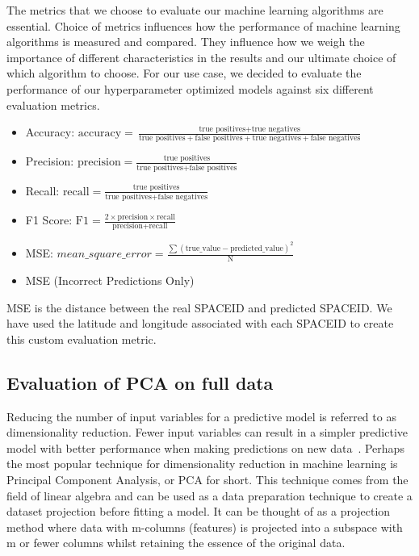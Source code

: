 \documentclass[a4paper,singleside,12pt]{report} %
\begin{document}
				The metrics that we choose to evaluate our machine learning algorithms are essential. 
				Choice of metrics influences how the performance of machine learning algorithms is measured and compared. 
				They influence how we weigh the importance of different characteristics in the results and our ultimate choice of which algorithm to choose. 
				For our use case, we decided to evaluate the performance of our hyperparameter optimized models against six different evaluation metrics. 

				\begin{itemize}
				\item Accuracy: $ \text{accuracy} = \frac{\text{true positives} + \text{true negatives}}{\text{true positives} + \text{false positives} + \text{true negatives} + \text{false negatives}}$
				\item Precision: $ \text{precision} = \frac{\text{true positives}}{\text{true positives} + \text{false positives}}$
				\item Recall: $ \text{recall} = \frac{\text{true positives}}{\text{true positives} + \text{false negatives}}$
				\item F1 Score: $ \text{F1} = \frac{2 \times \text{precision} \times \text{recall}}{\text{precision} + \text{recall}}$
				\item MSE: $mean\_square\_error = \frac{\sum (\text{true\_value} - \text{predicted\_value})^2}{\text{N}}$
				\item MSE (Incorrect Predictions Only)
				\end{itemize}
				
				MSE is the distance between the real SPACEID and predicted SPACEID. We have used the latitude and longitude associated with each SPACEID to create this custom evaluation metric. 

			\subsection{Evaluation of PCA on full data}
				Reducing the number of input variables for a predictive model is referred to as dimensionality reduction. 
				Fewer input variables can result in a simpler predictive model with better performance when making predictions on new data~\cite{howley2005effect}.
				Perhaps the most popular technique for dimensionality reduction in machine learning is Principal Component Analysis, or PCA for short. 
				This technique comes from the field of linear algebra and can be used as a data preparation technique to create a dataset projection before fitting a model. 
				It can be thought of as a projection method where data with m-columns (features) is projected into a subspace with m or fewer columns whilst retaining the essence of the original data.
				
\end{document}
